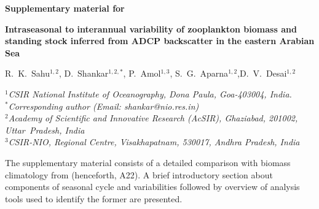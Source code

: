 \documentclass[12pt,a4paper]{article}
\begin{document}
\begin{center}
\textbf{Supplementary material for}

\vspace{5mm}

\textbf{\Large{Intraseasonal to interannual variability of zooplankton biomass and standing stock inferred from ADCP backscatter in the eastern Arabian Sea}}

  \vspace{5mm}

  {R.~K.~Sahu$^{1,2}$, D.~Shankar$^{1,2,*}$, P.~Amol$^{1,3}$, S.~G.~Aparna$^{1,2}$,D.~V.~Desai$^{1,2}$}\\

  \vspace{5mm}

\textit{$^1$CSIR National Institute of Oceanography, Dona Paula, Goa-403004, India.} \\
    \textit{$^*$Corresponding author (Email: shankar@nio.res.in)} \\
\textit{$^2$Academy of Scientific and Innovative Research (AcSIR), 
	Ghaziabad, 201002, Uttar~Pradesh, India} \\
\textit{$^3$CSIR-NIO, Regional Centre, Visakhapatnam, 530017, Andhra Pradesh, India}
  \vspace{5mm}

\end{center}
\linenumbers
	The supplementary material consists of a detailed comparison with biomass climatology from \citep{aparna2022seasonal} (henceforth, A22). A brief introductory section about components of seasonal cycle and variabilities followed by overview of analysis tools used to identify the former are presented.
\end{document}
